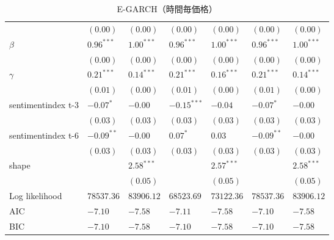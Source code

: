 \begin{landscape}
\begin{table}[]
\begin{tabular}{lllllll}
                   & $(0.00)$      & $(0.00)$      & $(0.00)$      & $(0.00)$      & $(0.00)$      & $(0.00)$      \\
$\beta$            & $0.96^{***}$  & $1.00^{***}$  & $0.96^{***}$  & $1.00^{***}$  & $0.96^{***}$  & $1.00^{***}$  \\
                   & $(0.00)$      & $(0.00)$      & $(0.00)$      & $(0.00)$      & $(0.00)$      & $(0.00)$      \\
$\gamma$           & $0.21^{***}$  & $0.14^{***}$  & $0.21^{***}$  & $0.16^{***}$  & $0.21^{***}$  & $0.14^{***}$  \\
                   & $(0.01)$      & $(0.00)$      & $(0.01)$      & $(0.00)$      & $(0.01)$      & $(0.00)$      \\
sentimentindex t-3 & $-0.07^{*}$   & $-0.00$       & $-0.15^{***}$ & $-0.04$       & $-0.07^{*}$   & $-0.00$       \\
                   & $(0.03)$      & $(0.03)$      & $(0.03)$      & $(0.03)$      & $(0.03)$      & $(0.03)$      \\
sentimentindex t-6 & $-0.09^{**}$  & $-0.00$       & $0.07^{*}$    & $0.03$        & $-0.09^{**}$  & $-0.00$       \\
                   & $(0.03)$      & $(0.03)$      & $(0.03)$      & $(0.03)$      & $(0.03)$      & $(0.03)$      \\
shape              &               & $2.58^{***}$  &               & $2.57^{***}$  &               & $2.58^{***}$  \\
                   &               & $(0.05)$      &               & $(0.05)$      &               & $(0.05)$      \\ \hline
Log likelihood     & $78537.36$    & $83906.12$    & $68523.69$    & $73122.36$    & $78537.36$    & $83906.12$    \\
AIC                & $-7.10$       & $-7.58$       & $-7.11$       & $-7.58$       & $-7.10$       & $-7.58$       \\
BIC                & $-7.10$       & $-7.58$       & $-7.10$       & $-7.58$       & $-7.10$       & $-7.58$       \\ \hline
\end{tabular}
\caption{E-GARCH（時間毎価格）}

\end{table}
\end{landscape}


